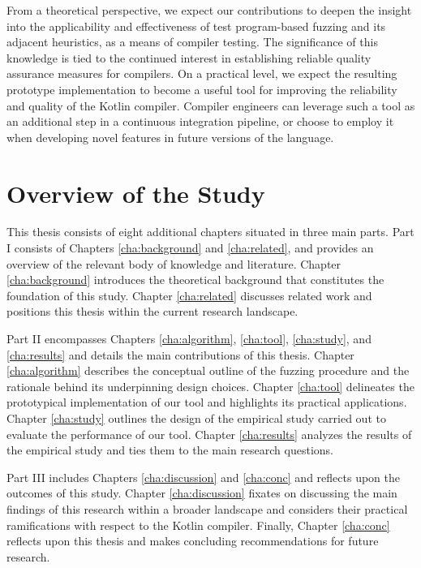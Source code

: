 From a theoretical perspective, we expect our contributions
to deepen the insight into the applicability and effectiveness
of test program-based fuzzing and its adjacent heuristics, as a 
means of compiler testing. 
The significance of this knowledge is tied to the continued
interest in establishing reliable quality assurance measures for compilers.
On a practical level, we expect the resulting
prototype implementation to become a useful tool for improving the 
reliability and quality of the Kotlin compiler.
Compiler engineers can leverage such a tool as an additional
step in a continuous integration pipeline, or choose to employ it
when developing novel features in future versions of the language.

\section{Overview of the Study}

This thesis consists of eight additional chapters situated in three main parts.
Part I consists of Chapters \ref{cha:background} and \ref{cha:related}, and
provides an overview of the relevant body of knowledge and literature.
Chapter \ref{cha:background} introduces the theoretical background
that constitutes the foundation of this study.
Chapter \ref{cha:related} discusses related work and positions this
thesis within the current research landscape.

Part II encompasses Chapters \ref{cha:algorithm}, \ref{cha:tool}, \ref{cha:study}, and \ref{cha:results}
and details the main contributions of this thesis. 
Chapter \ref{cha:algorithm} describes the conceptual outline of
the fuzzing procedure and the rationale behind its
underpinning design choices.
Chapter \ref{cha:tool} delineates the prototypical implementation
of our tool and highlights its practical applications.
Chapter \ref{cha:study} outlines the design of the empirical
study carried out to evaluate the performance of our tool.
Chapter \ref{cha:results} analyzes the results of the empirical study
and ties them to the main research questions.

Part III includes Chapters \ref{cha:discussion} and \ref{cha:conc} 
and reflects upon the outcomes of this study.
Chapter \ref{cha:discussion} fixates on discussing the main 
findings of this research within a broader landscape
and considers their practical ramifications with respect to the Kotlin compiler.
Finally, Chapter \ref{cha:conc} reflects upon this
thesis and makes concluding recommendations for future research.

